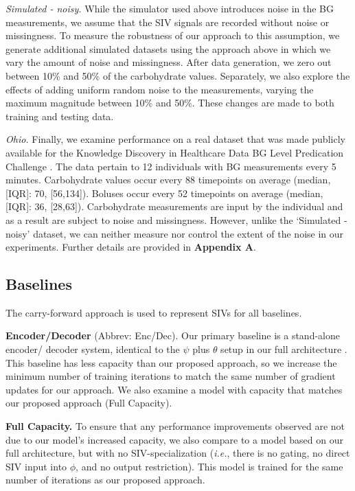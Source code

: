 \documentclass[letterpaper]{article}
\begin{document}
\textit{Simulated - noisy.} While the simulator used above introduces noise in the BG measurements, we assume that the SIV signals are recorded without noise or missingness. To measure the robustness of our approach to this assumption, we generate additional simulated datasets using the approach above in which we vary the amount of noise and missingness. After data generation, we zero out between 10\% and 50\% of the carbohydrate values. Separately, we also explore the effects of adding uniform random noise to the measurements, varying the maximum magnitude between 10\% and 50\%. These changes are made to both training and testing data.

\textit{Ohio.} Finally, we examine performance on a real dataset that was made publicly available for the Knowledge Discovery in Healthcare Data BG Level Predication Challenge \cite{kn:oc}.
The data pertain to 12 individuals with BG measurements every 5 minutes. Carbohydrate values occur every 88 timepoints on average (median, [IQR]: 70, [56,134]). Boluses occur every 52 timepoints on average (median, [IQR]: 36, [28,63]). Carbohydrate measurements are input by the individual and as a result are subject to noise and missingness. However, unlike the `Simulated - noisy' dataset, we can neither measure nor control the extent of the noise in our experiments. Further details are provided in \textbf{Appendix A}.





\subsection{Baselines}

The carry-forward approach is used to represent SIVs for all baselines.

\textbf{Encoder/Decoder} (Abbrev: Enc/Dec). Our primary baseline is a stand-alone encoder/ decoder system, identical to the $\psi$ plus $\theta$ setup in our full architecture \cite{iankdd}. This baseline has less capacity than our proposed approach, so we increase the minimum number of training iterations to match the same number of gradient updates for our approach. We also examine a model with capacity that matches our proposed approach (Full Capacity).

\textbf{Full Capacity.} To ensure that any performance improvements observed are not due to our model's increased capacity, we also compare  to a model based on our full architecture, but with no SIV-specialization (\textit{i.e.}, there is no gating,  no direct SIV input into $\phi$, and no output restriction). This model is trained for the same number of iterations as our proposed approach.
\end{document}
